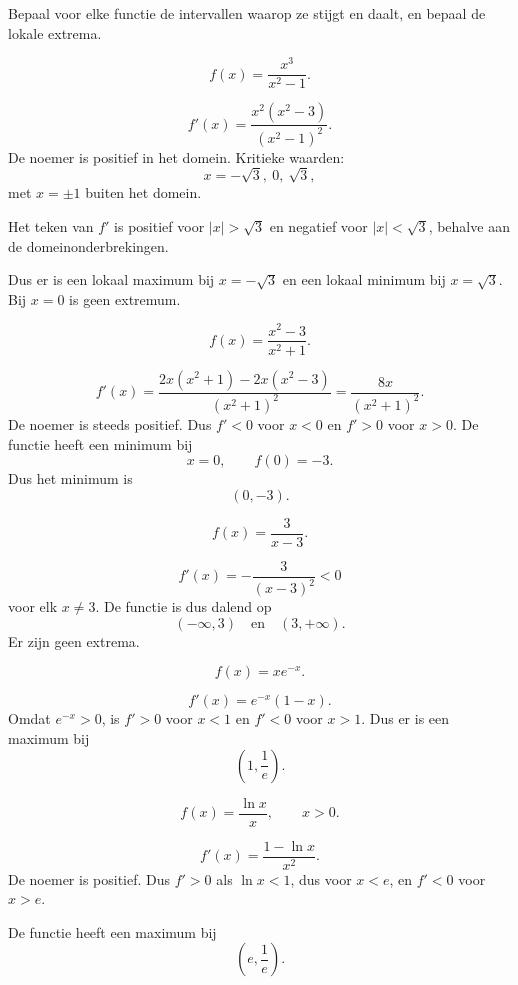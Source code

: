 \documentclass{ximera}
\begin{document}
\begin{oefening}{\oefB\ESS}
Bepaal voor elke functie de intervallen waarop ze stijgt en daalt, en
bepaal de lokale extrema.

\begin{question}
\[
f(x)=\frac{x^3}{x^2-1}.
\]
\begin{oplossing}
\[
f'(x)=\frac{x^2(x^2-3)}{(x^2-1)^2}.
\]
De noemer is positief in het domein. Kritieke waarden:
\[
x=-\sqrt3,\ 0,\ \sqrt3,
\]
met \(x=\pm1\) buiten het domein.

Het teken van \(f'\) is positief voor \(|x|>\sqrt3\) en negatief voor
\(|x|<\sqrt3\), behalve aan de domeinonderbrekingen.

Dus er is een lokaal maximum bij \(x=-\sqrt3\) en een lokaal minimum
bij \(x=\sqrt3\). Bij \(x=0\) is geen extremum.
\end{oplossing}
\end{question}

\begin{question}
\[
f(x)=\frac{x^2-3}{x^2+1}.
\]
\begin{oplossing}
\[
f'(x)=\frac{2x(x^2+1)-2x(x^2-3)}{(x^2+1)^2}
=\frac{8x}{(x^2+1)^2}.
\]
De noemer is steeds positief. Dus \(f'<0\) voor \(x<0\) en \(f'>0\)
voor \(x>0\). De functie heeft een minimum bij
\[
x=0,\qquad f(0)=-3.
\]
Dus het minimum is
\[
\boxed{(0,-3)}.
\]
\end{oplossing}
\end{question}

\begin{question}
\[
f(x)=\frac{3}{x-3}.
\]
\begin{oplossing}
\[
f'(x)=-\frac{3}{(x-3)^2}<0
\]
voor elk \(x\neq3\). De functie is dus dalend op
\[
(-\infty,3)\quad\text{en}\quad(3,+\infty).
\]
Er zijn geen extrema.
\end{oplossing}
\end{question}

\begin{question}
\[
f(x)=x e^{-x}.
\]
\begin{oplossing}
\[
f'(x)=e^{-x}(1-x).
\]
Omdat \(e^{-x}>0\), is \(f'>0\) voor \(x<1\) en \(f'<0\) voor \(x>1\).
Dus er is een maximum bij
\[
\boxed{\left(1,\frac1e\right)}.
\]
\end{oplossing}
\end{question}

\begin{question}
\[
f(x)=\frac{\ln x}{x},\qquad x>0.
\]
\begin{oplossing}
\[
f'(x)=\frac{1-\ln x}{x^2}.
\]
De noemer is positief. Dus \(f'>0\) als \(\ln x<1\), dus voor \(x<e\),
en \(f'<0\) voor \(x>e\).

De functie heeft een maximum bij
\[
\boxed{\left(e,\frac1e\right)}.
\]
\end{oplossing}
\end{question}
\end{oefening}
\end{document}
